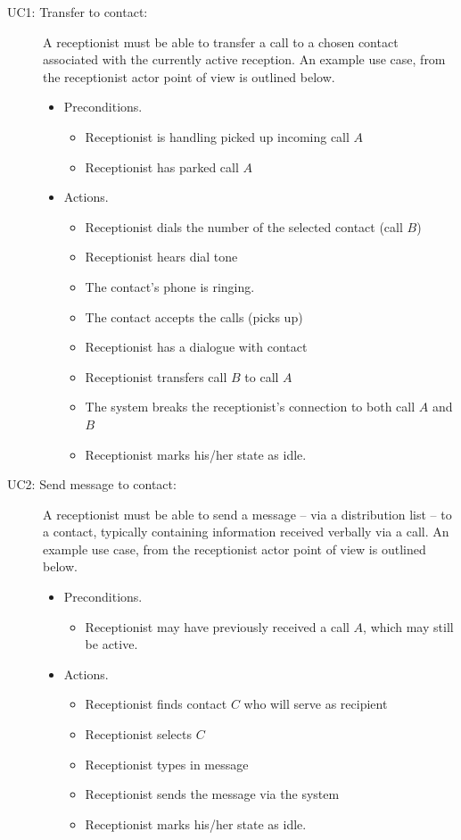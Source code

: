 \begin{description}
  \item[UC1: Transfer to contact:] A receptionist must be able to transfer a call to a chosen contact associated with the currently active reception. An example use case, from the receptionist actor point of view is outlined below.
  \begin{itemize}
    \item Preconditions.
    \begin{itemize}
      \item Receptionist is handling picked up incoming call $A$
      \item Receptionist has parked call $A$
    \end{itemize}
    \item Actions.
    \begin{itemize}
      \item Receptionist dials the number of the selected contact (call $B$)
      \item Receptionist hears dial tone
      \item The contact's phone is ringing.
      \item The contact accepts the calls (picks up)
      \item Receptionist has a dialogue with contact
      \item Receptionist transfers call $B$ to call $A$
      \item The system breaks the receptionist's connection to both call $A$ and $B$    
      \item Receptionist marks his/her state as idle.
    \end{itemize}
  \end{itemize}

  \item[UC2: Send message to contact:] A receptionist must be able to send a message -- via a distribution list -- to a contact, typically containing information received verbally via a call. An example use case, from the receptionist actor point of view is outlined below.
  \begin{itemize}
    \item Preconditions.
    \begin{itemize}
      \item Receptionist may have previously received a call $A$, which may still be active.
    \end{itemize}
    \item Actions.
    \begin{itemize}
      \item Receptionist finds contact $C$ who will serve as recipient
      \item Receptionist selects $C$
      \item Receptionist types in message
      \item Receptionist sends the message via the system
      \item Receptionist marks his/her state as idle.
    \end{itemize}
  \end{itemize}
\end{description}

